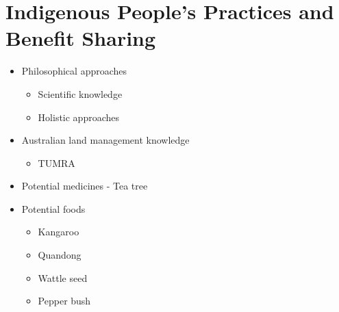 \section{Indigenous People's Practices and Benefit Sharing} \label{20/11/2024}
	\begin{itemize}
		\item Philosophical approaches
		\begin{itemize}
			\item Scientific knowledge
			\item Holistic approaches
		\end{itemize}
		\item Australian land management knowledge
		\begin{itemize}
			\item TUMRA
		\end{itemize}
		\item Potential medicines - Tea tree
		\item Potential foods
		\begin{itemize}
			\item Kangaroo
			\item Quandong
			\item Wattle seed
			\item Pepper bush
		\end{itemize}
	\end{itemize}


